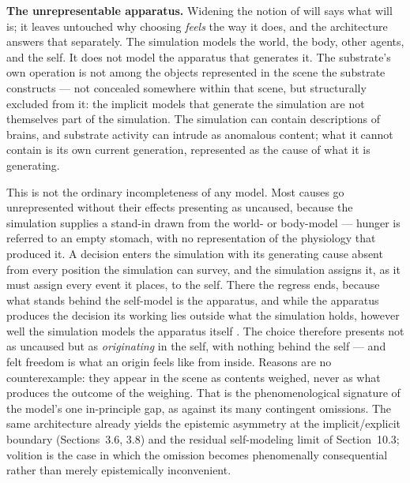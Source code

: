 \documentclass[12pt]{article}
\begin{document}
\textbf{The unrepresentable apparatus.} Widening the notion of will says what will is; it leaves untouched why choosing \emph{feels} the way it does, and the architecture answers that separately. The simulation models the world, the body, other agents, and the self. It does not model the apparatus that generates it. The substrate's own operation is not among the objects represented in the scene the substrate constructs --- not concealed somewhere within that scene, but structurally excluded from it: the implicit models that generate the simulation are not themselves part of the simulation. The simulation can contain descriptions of brains, and substrate activity can intrude as anomalous content; what it cannot contain is its own current generation, represented as the cause of what it is generating.

This is not the ordinary incompleteness of any model. Most causes go unrepresented without their effects presenting as uncaused, because the simulation supplies a stand-in drawn from the world- or body-model --- hunger is referred to an empty stomach, with no representation of the physiology that produced it. A decision enters the simulation with its generating cause absent from every position the simulation can survey, and the simulation assigns it, as it must assign every event it places, to the self. There the regress ends, because what stands behind the self-model is the apparatus, and while the apparatus produces the decision its working lies outside what the simulation holds, however well the simulation models the apparatus itself \citep{Gruber2026h}. The choice therefore presents not as uncaused but as \emph{originating} in the self, with nothing behind the self --- and felt freedom is what an origin feels like from inside. Reasons are no counterexample: they appear in the scene as contents weighed, never as what produces the outcome of the weighing. That is the phenomenological signature of the model's one in-principle gap, as against its many contingent omissions. The same architecture already yields the epistemic asymmetry at the implicit/explicit boundary (Sections~3.6, 3.8) and the residual self-modeling limit of Section~10.3; volition is the case in which the omission becomes phenomenally consequential rather than merely epistemically inconvenient.
\end{document}
